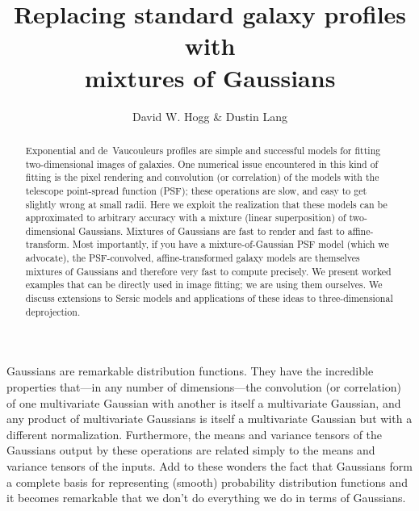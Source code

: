 \documentclass[12pt,pdftex,preprint]{aastex}
\begin{document}
\title{Replacing standard galaxy profiles with \\ mixtures of Gaussians}
\author{David W. Hogg \&
        Dustin Lang}

\begin{abstract}
Exponential and de~Vaucouleurs profiles are simple and successful
models for fitting two-dimensional images of galaxies.  One numerical
issue encountered in this kind of fitting is the pixel rendering and
convolution (or correlation) of the models with the telescope
point-spread function (PSF); these operations are slow, and easy to
get slightly wrong at small radii.  Here we exploit the realization
that these models can be approximated to arbitrary accuracy with a
mixture (linear superposition) of two-dimensional Gaussians.  Mixtures
of Gaussians are fast to render and fast to affine-transform.  Most
importantly, if you have a mixture-of-Gaussian PSF model (which we
advocate), the PSF-convolved, affine-transformed galaxy models are
themselves mixtures of Gaussians and therefore very fast to compute
precisely.  We present worked examples that can be directly used in
image fitting; we are using them ourselves.  We discuss extensions to
Sersic models and applications of these ideas to three-dimensional
deprojection.
\end{abstract}

Gaussians are remarkable distribution functions.  They have the
incredible properties that---in any number of dimensions---the
convolution (or correlation) of one multivariate Gaussian with another
is itself a multivariate Gaussian, and any product of multivariate
Gaussians is itself a multivariate Gaussian but with a different
normalization.  Furthermore, the means and variance tensors of the
Gaussians output by these operations are related simply to the means
and variance tensors of the inputs.  Add to these wonders the fact
that Gaussians form a complete basis for representing (smooth)
probability distribution functions and it becomes remarkable that we
don't do everything we do in terms of Gaussians.
\end{document}

